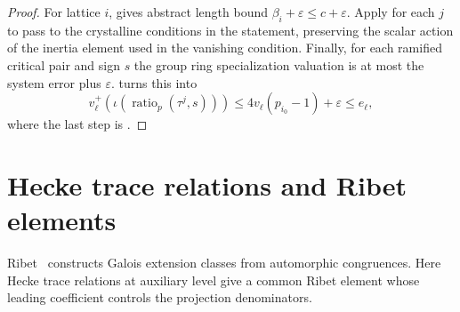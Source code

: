 \begin{proof}
For lattice $i$,  gives abstract length bound $\beta_i+\varepsilon\le c+\varepsilon$. Apply  for each $j$ to pass to the crystalline conditions in the statement, preserving the scalar action of the inertia element used in the vanishing condition.
Finally, for each ramified critical pair and sign $s$ the group ring specialization valuation is at most the system error plus $\varepsilon$.  turns this into
\[
 v_\ell^+(\iota(\operatorname{ratio}_p(\tau^j,s)))
 \le4v_\ell(p_{i_0}-1)+\varepsilon\le e_\ell,
\]
where the last step is .
\end{proof}

\section{Hecke trace relations and Ribet elements}
\label{sec:c-ribet}

Ribet~\cite{Ribet1976} constructs Galois extension classes from automorphic congruences. Here Hecke trace relations at auxiliary level give a common Ribet element whose leading coefficient controls the projection denominators.

